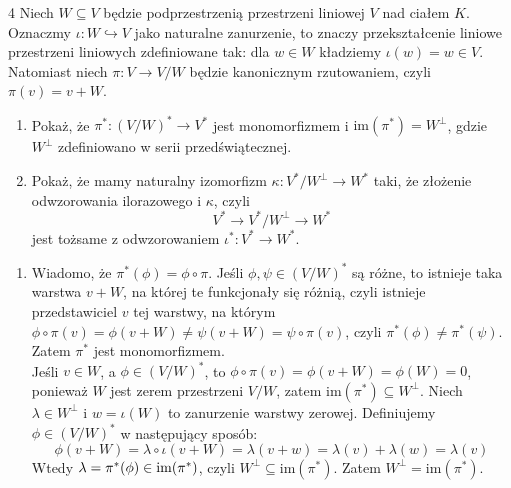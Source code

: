 \documentclass{../note}
\begin{document}
\begin{zadanie}{4}
Niech $W\subseteq V$ będzie podprzestrzenią przestrzeni liniowej $V$ nad ciałem $K$. Oznaczmy $\iota:W\hookrightarrow V$ jako naturalne zanurzenie, to znaczy przekształcenie liniowe przestrzeni liniowych zdefiniowane tak: dla $w\in W$ kładziemy $\iota(w)=w\in V$. Natomiast niech $\pi:V\rightarrow V/W$ będzie kanonicznym rzutowaniem, czyli $\pi(v)=v+W$.
\begin{enumerate}[label=(\alph*)]
    \item Pokaż, że $\pi^{*}:(V/W)^{*}\rightarrow V^{*}$ jest monomorfizmem i $\text{im}(\pi^{*})=W^{\perp}$, gdzie $W^{\perp}$ zdefiniowano w serii przedświątecznej.
    \item Pokaż, że mamy naturalny izomorfizm $\kappa:V^{*}/W^{\perp}\rightarrow W^{*}$ taki, że złożenie odwzorowania ilorazowego i $\kappa$, czyli
    $$ V^{*}\longrightarrow V^{*}/W^{\perp}\longrightarrow W^{*} $$
    jest tożsame z odwzorowaniem $\iota^{*}:V^{*}\rightarrow W^{*}$.
\end{enumerate}
\end{zadanie}
\begin{rozwiazanie}
\begin{enumerate}[label=(\alph*)]
    \item Wiadomo, że $\pi^*(\phi) = \phi \circ \pi$. Jeśli $\phi, \psi \in (V / W)^*$ są różne, to istnieje taka warstwa $v + W$, na której te funkcjonały się różnią, czyli istnieje przedstawiciel $v$ tej warstwy, na którym $\phi \circ \pi(v) = \phi(v + W) \neq \psi(v + W) = \psi \circ \pi(v)$, czyli $\pi^*(\phi) \neq \pi^*(\psi)$. Zatem $\pi^*$ jest monomorfizmem.\\
    Jeśli $v \in W$, a $\phi \in (V / W)^*$, to $\phi \circ \pi(v) = \phi(v + W) = \phi(W) = 0$, ponieważ $W$ jest zerem przestrzeni $V / W$, zatem $\text{im}(\pi^{*})\subseteq W^{\perp}$. Niech $\lambda \in W^\perp$ i $w = \iota(W)$ to zanurzenie warstwy zerowej. Definiujemy $\phi \in (V / W)^*$ w następujący sposób:
    \[\phi(v + W) = \lambda\circ\iota(v + W) = \lambda(v+w) = \lambda(v) + \lambda(w) = \lambda(v)\]
    Wtedy $\lambda = \pi^*(\phi) \in \operatorname{im}(\pi^*)$, czyli $W^{\perp} \subseteq \text{im}(\pi^{*})$. Zatem $W^{\perp} = \text{im}(\pi^{*})$.
\end{enumerate}
\end{rozwiazanie}
\end{document}
